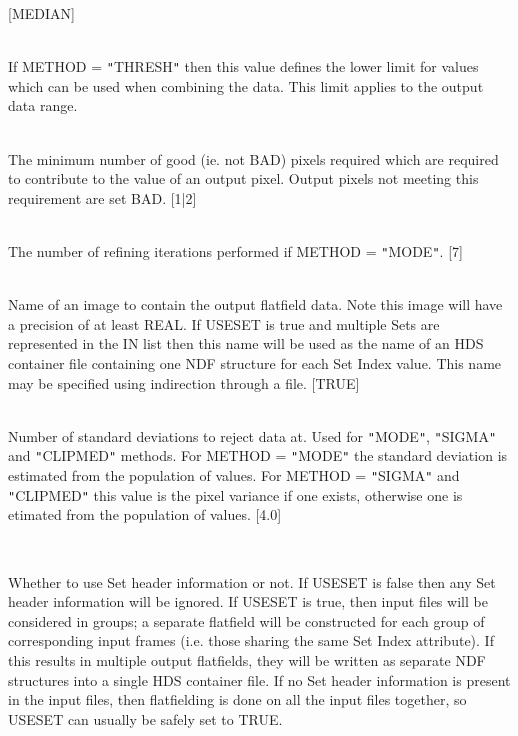 \documentclass[twoside,11pt]{article}
\renewcommand{\_}{\texttt{\symbol{95}}}
\newcommand{\qt}[1]{{\tt "}#1{\tt "}}
\newcommand{\sstsubsection}[1]{ \item[{#1}] \mbox{} \\}
\newcommand{\sstsubsection}[1]{\item[{#1}]}
\begin{document}
{{{         [MEDIAN]
      }
      \sstsubsection{
         MIN = \_REAL (Read)
      } {
         If METHOD = \qt{THRESH} then this value defines the lower limit
         for values which can be used when combining the data. This
         limit applies to the output data range.
      }
      \sstsubsection{
         MINPIX = \_INTEGER (Read)
      } {
         The minimum number of good (ie. not BAD) pixels required which
         are required to contribute to the value of an output pixel.
         Output pixels not meeting this requirement are set BAD.
         [1|2]
      }
      \sstsubsection{
         NITER = \_INTEGER (Read)
      } {
         The number of refining iterations performed if METHOD = \qt{MODE}.
         [7]
      }
      \sstsubsection{
         OUT = LITERAL (Write)
      } {
         Name of an image to contain the output flatfield data. Note this
         image will have a precision of at least \_REAL. 
         If USESET is true and multiple Sets are represented in the IN
         list then this name will be used as the name of an HDS 
         container file containing one NDF structure for each Set Index value.
         This name may be specified using indirection through a file.
         [TRUE]
      }
      \sstsubsection{
         SIGMAS = \_REAL (Read)
      } {
         Number of standard deviations to reject data at. Used for
         \qt{MODE}, \qt{SIGMA} and \qt{CLIPMED} methods. For METHOD =
         \qt{MODE} the standard deviation is estimated from the
         population of values. For METHOD = \qt{SIGMA} and
         \qt{CLIPMED} this value is the pixel variance if one exists,
         otherwise one is etimated from the population of values.
         [4.0]
      }
      \sstsubsection{
         USESET = \_LOGICAL (Read)
      } {
         Whether to use Set header information or not.  If USESET is
         false then any Set header information will be ignored.
         If USESET is true, then input files will be considered in
         groups; a separate flatfield will be constructed for each
         group of corresponding input frames (i.e. those sharing 
         the same Set Index attribute).  If this results in multiple
         output flatfields, they will be written as separate NDF structures into
         a single HDS container file.  If no Set header information 
         is present in the input files, then flatfielding is done  
         on all the input files together, so USESET can usually be 
         safely set to TRUE.

}}}
\end{document}
